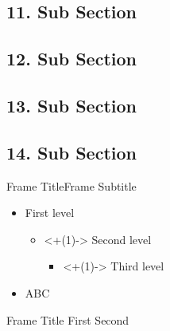 \documentclass[169,8pt]{beamer}
\begin{document}
    \subsection{11. Sub Section}
    \subsection{12. Sub Section}
    \subsection{13. Sub Section}
    \subsection{14. Sub Section}

        \begin{frame}{Frame Title}{Frame Subtitle}
            \begin{tcolorbox}[left=0mm,right=0mm,boxsep=0mm,sharp corners]
                \setlength{\leftmargini}{\labelwidth}
                \begin{itemize}
                    \item First level
                    \begin{itemize}
                        \item<+(1)-> Second level
                            \begin{itemize}
                                \item<+(1)-> Third level
                            \end{itemize}
                    \end{itemize}
                    \item[\adjustbox{max width=\labelwidth}{\faLongArrowAltRight}] ABC
                \end{itemize}
            \end{tcolorbox}
        \end{frame}

        \begin{frame}{Frame Title}
            First
            \pause
            Second
        \end{frame}
\end{document}
